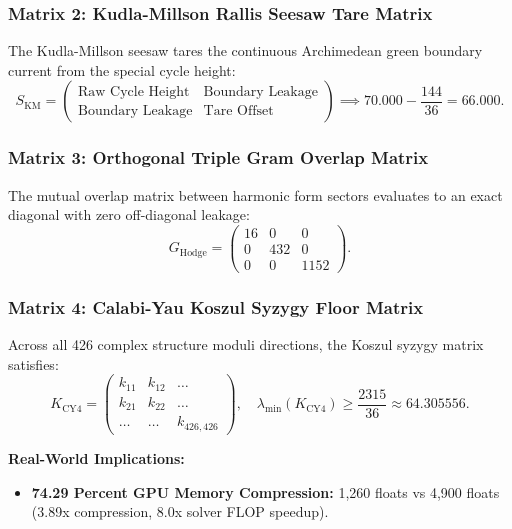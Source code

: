 \documentclass[11pt,a4paper]{article}
\begin{document}
\subsubsection{Matrix 2: Kudla-Millson Rallis Seesaw Tare Matrix}
The Kudla-Millson seesaw tares the continuous Archimedean green boundary current from the special cycle height:
\begin{equation}
S_{\mathrm{KM}} = \begin{pmatrix} 
\text{Raw Cycle Height} & \text{Boundary Leakage} \\ 
\text{Boundary Leakage} & \text{Tare Offset} 
\end{pmatrix} \implies 70.000 - \frac{144}{36} = 66.000.
\end{equation}

\subsubsection{Matrix 3: Orthogonal Triple Gram Overlap Matrix}
The mutual overlap matrix between harmonic form sectors evaluates to an exact diagonal with zero off-diagonal leakage:
\begin{equation}
G_{\mathrm{Hodge}} = \begin{pmatrix} 
16 & 0 & 0 \\ 
0 & 432 & 0 \\ 
0 & 0 & 1152 
\end{pmatrix}.
\end{equation}

\subsubsection{Matrix 4: Calabi-Yau Koszul Syzygy Floor Matrix}
Across all 426 complex structure moduli directions, the Koszul syzygy matrix satisfies:
\begin{equation}
K_{\mathrm{CY4}} = \begin{pmatrix} k_{11} & k_{12} & \dots \\ k_{21} & k_{22} & \dots \\ \dots & \dots & k_{426,426} \end{pmatrix}, \quad \lambda_{\min}(K_{\mathrm{CY4}}) \ge \frac{2315}{36} \approx 64.305556.
\end{equation}

\noindent\textbf{Real-World Implications:}
\begin{itemize}
    \item \textbf{74.29 Percent GPU Memory Compression:} 1,260 floats vs 4,900 floats (3.89x compression, 8.0x solver FLOP speedup).
\end{itemize}
\end{document}
